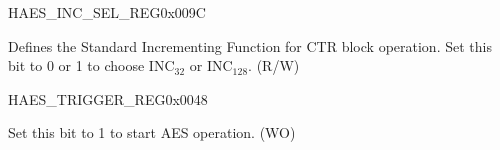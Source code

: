\begin{register}{H}{AES\_INC\_SEL\_REG}{0x{}009C}\label{regdesc:AESINCSELREG}
%
%
\regnewline%
\begin{regdesc}\begin{reglist}
\item [AES\_INC\_SEL] Defines the Standard Incrementing Function for CTR block operation. Set this bit to 0 or 1 to choose INC$_{32}$ or INC$_{128}$. (R/W)
\end{reglist}\end{regdesc}
\end{register}

\begin{register}{H}{AES\_TRIGGER\_REG}{0x{}0048}\label{regdesc:AESTRIGGERREG}
%
%
\regnewline%
\begin{regdesc}\begin{reglist}
\item [AES\_TRIGGER] Set this bit to 1 to start AES operation. (WO)
\end{reglist}\end{regdesc}
\end{register}


